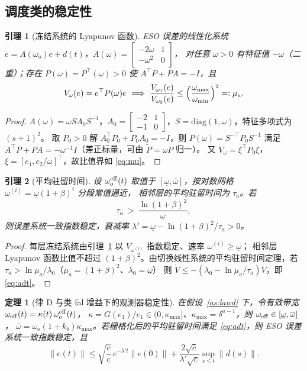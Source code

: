 \documentclass[11pt,a4paper]{article}
\newtheorem{lemma}{引理}
\newtheorem{theorem}{定理}
\theoremstyle{remark}
\begin{document}
\subsection{调度类的稳定性}
\begin{lemma}[冻结系统的 Lyapunov 函数]\label{lem:frozen}
ESO 误差的线性化系统 $\dot e=A(\omega_o)e+d(t)$，$A(\omega)=\begin{bmatrix}-2\omega&1\\-\omega^{2}&0\end{bmatrix}$，
对任意 $\omega>0$ 有特征值 $-\omega$（二重）；存在 $P(\omega)=P^{\top}(\omega)>0$ 使 $A^{\top}P+PA=-I$，且
\begin{equation}
V_\omega(e)=e^{\top}P(\omega)e\ \Longrightarrow\ \frac{V_{\omega_1}(e)}{V_{\omega_2}(e)}\le\Bigl(\frac{\omega_{\max}}{\omega_{\min}}\Bigr)^{2}=:\mu_a .
\label{eq:mu}
\end{equation}
\end{lemma}
\begin{proof}
$A(\omega)=\omega SA_0S^{-1}$，$A_0=\begin{bmatrix}-2&1\\-1&0\end{bmatrix}$，$S=\mathrm{diag}(1,\omega)$，特征多项式为 $(s+1)^2$。
取 $P_0>0$ 解 $A_0^{\top}P_0+P_0A_0=-I$，则 $P(\omega)=S^{-\top}P_0S^{-1}$ 满足 $A^{\top}P+PA=-\omega^{-1}I$（差正标量，可由 $\tilde P=\omega P$ 归一）。
又 $V_\omega=\xi^{\top}P_0\xi$，$\xi=[e_1,e_2/\omega]^{\top}$，故比值界如 \eqref{eq:mu}。
\end{proof}
\begin{lemma}[平均驻留时间]\label{lem:sched}
设 $\omega_o^{\rm eff}(t)$ 取值于 $[\underline\omega,\overline\omega]$，按对数网格 $\omega^{(i)}=\underline\omega(1+\beta)^{i}$ 分段常值逼近，
相邻层的平均驻留时间为 $\tau_a$。若
\begin{equation}
\tau_a\ >\ \frac{\ln(1+\beta)^{2}}{\underline\omega},
\label{eq:adt}
\end{equation}
则误差系统一致指数稳定，衰减率 $\lambda'=\underline\omega-\ln(1+\beta)^{2}/\tau_a>0$。
\end{lemma}
\begin{proof}
每层冻结系统由引理~\ref{lem:frozen} 以 $V_{\omega^{(i)}}$ 指数稳定、速率 $\omega^{(i)}\ge\underline\omega$；
相邻层 Lyapunov 函数比值不超过 $(1+\beta)^{2}$。由切换线性系统的平均驻留时间定理，若 $\tau_a>\ln\mu_a/\lambda_0$（$\mu_a=(1+\beta)^2$、$\lambda_0=\underline\omega$）
则 $\dot V\le-(\lambda_0-\ln\mu_a/\tau_a)V$，即 \eqref{eq:adt}。
\end{proof}
\begin{theorem}[律 D 与类 fal 增益下的观测器稳定性]\label{thm:gain}
在假设~\ref{as:lawd} 下，令有效带宽 $\omega_{\rm eff}(t)=\kappa(t)\,\omega_o^{\rm eff}(t)$，
$\kappa=G(e_1)/e_1\in(0,\kappa_{\max}]$、$\kappa_{\max}=\delta^{a-1}$，则 $\omega_{\rm eff}\in[\underline\omega,\overline\omega]$，
$\overline\omega=\omega_o(1+k_b)\kappa_{\max}$。若栅格化后的平均驻留时间满足 \eqref{eq:adt}，则 ESO 误差系统一致指数稳定，且
\begin{equation}
\|e(t)\|\le\sqrt{\frac{\overline c}{\underline c}}\,e^{-\lambda't}\|e(0)\|+\frac{2\sqrt{\overline c}}{\lambda'\sqrt{\underline c}}\sup_{s\le t}\|d(s)\| .
\label{eq:thm2}
\end{equation}
\end{theorem}
\end{document}
